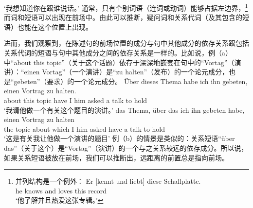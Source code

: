 \glt `我想知道你在跟谁说话。'
\zl
通常，只有个别词语（连词或动词）能够占据左边界，\footnote{
 并列结构是一个例外：
\ea
\gll Er [kennt und liebt] diese Schallplatte.\\
     he \spacebr{}knows and loves this record\\
\glt `他了解并且热爱这张专辑。'
\z
} 
而词和短语可以出现在前场中。由此可以推断，疑问词和关系代词（及其包含的短语）也能在这个位置上出现。

进而，我们观察到，在陈述句的前场位置的成分与句中其他成分的依存关系跟包括关系代词的短语与句中其他成分之间的依存关系是一样的。比如说，例（a）中“about this topic”（关于这个话题）依存于深深地嵌套在句中的“Vortag”（演讲）：“einen Vortag”（一个演讲）是“zu halten”（发布）的一个论元成分，也是“gebeten”（要求）的一个论元成分。
\eal
\ex 
\gll Über dieses Thema habe ich ihn gebeten, einen Vortrag zu halten.\\
     about this topic  have I   him asked    a     talk    to hold\\
\glt `我请他做一个有关这个题目的演讲。'
\ex 
\gll das Thema, über das ich ihn gebeten habe, einen Vortrag zu halten\\
     the topic  about which I him asked have a talk to hold\\
\glt `这是有关我让他做一个演讲的题目'
\zl
例（b）的情景是类似的：关系短语“über das”（关于这个）是“Vortag”（演讲）的一个与之关系较远的依存成分。所以说，如果关系短语被放在前场，我们可以推断出，远距离的前置总是指向前场。

